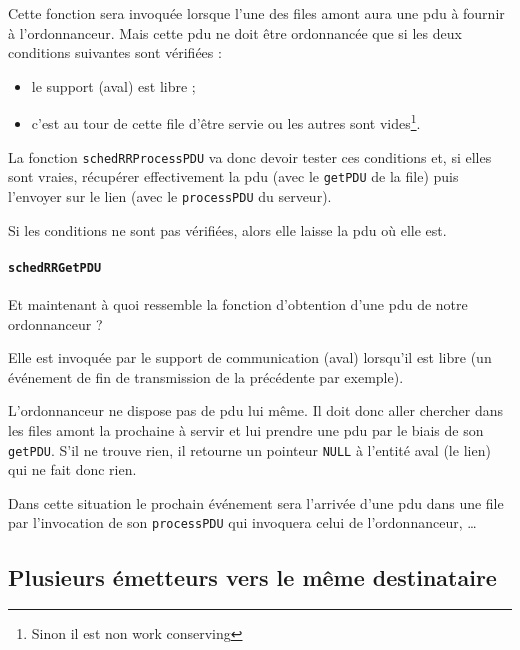 \documentclass{article}
\begin{document}
   Cette fonction sera invoquée lorsque l'une des files amont aura une
{\sc pdu} à fournir à l'ordonnanceur. Mais cette {\sc pdu} ne doit
être ordonnancée que si les deux conditions suivantes sont vérifiées :

\begin{itemize}
   \item le support (aval) est libre ;
   \item c'est au tour de cette file d'être servie ou les autres sont
     vides\footnote{Sinon il est non work conserving}.
\end{itemize}

   La fonction \lstinline!schedRRProcessPDU! va donc devoir tester ces
conditions et, si elles sont vraies, récupérer effectivement la {\sc
  pdu} (avec le \lstinline!getPDU! de la file) puis l'envoyer sur le
lien (avec le \lstinline!processPDU! du serveur). 

   Si les conditions ne sont pas vérifiées, alors elle laisse la {\sc
pdu} où elle est.

%
%
%
\paragraph{\lstinline!schedRRGetPDU!}

   Et maintenant à quoi ressemble la fonction d'obtention d'une {\sc
 pdu} de notre ordonnanceur ?

   Elle est invoquée par le support de communication (aval) lorsqu'il
est libre (un événement de fin de transmission de la précédente par
exemple).

   L'ordonnanceur ne dispose pas de {\sc pdu} lui même. Il doit donc
aller chercher dans les files amont la prochaine à servir et lui
prendre une {\sc pdu} par le biais de son \lstinline!getPDU!. S'il ne
trouve rien, il retourne un pointeur \lstinline!NULL! à l'entité aval
(le lien) qui ne fait donc rien.

   Dans cette situation le prochain événement sera l'arrivée d'une
{\sc pdu} dans une file par l'invocation de son \lstinline!processPDU!
qui invoquera celui de l'ordonnanceur, \ldots

%
\subsection{Plusieurs émetteurs vers le même destinataire}
\end{document}
